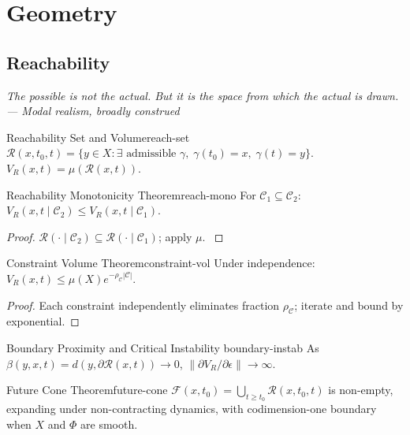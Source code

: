 \documentclass[12pt,twoside,openright]{book}
\newcommand{\reach}{\mathcal{R}}
\newenvironment{epigraph}[2]{%
  \vspace{1em}\begin{flushright}
  \begin{minipage}{0.72\textwidth}
  \itshape\small #1\\[0.4em]
  \upshape\footnotesize\sffamily\color{DistGray}--- #2
  \end{minipage}\end{flushright}\vspace{1.5em}}{}
\begin{document}
\part{Geometry}

\chapter{Reachability}
\label{ch:reachability}
\begin{epigraph}{The possible is not the actual.
  But it is the space from which the actual is drawn.}%
  {Modal realism, broadly construed}
\end{epigraph}

\begin{definition}{Reachability Set and Volume}{reach-set}
  $\reach(x,t_0,t)=\{y\in X:\exists\text{ admissible }
  \gamma,\;\gamma(t_0)=x,\;\gamma(t)=y\}$.
  $V_R(x,t)=\mu(\reach(x,t))$.
\end{definition}

\begin{theorem}{Reachability Monotonicity Theorem}{reach-mono}
  For $\mathcal{C}_1\subseteq\mathcal{C}_2$:
  $V_R(x,t\mid\mathcal{C}_2)\le V_R(x,t\mid\mathcal{C}_1)$.
\end{theorem}
\begin{proof}
  $\reach(\cdot\mid\mathcal{C}_2)\subseteq
  \reach(\cdot\mid\mathcal{C}_1)$; apply $\mu$.
  \parencite{sontag1998}
\end{proof}

\begin{theorem}{Constraint Volume Theorem}{constraint-vol}
  Under independence:
  $V_R(x,t)\le\mu(X)e^{-\rho_\mathcal{C}|\mathcal{C}|}$.
\end{theorem}
\begin{proof}
  Each constraint independently eliminates fraction
  $\rho_\mathcal{C}$; iterate and bound by exponential.
\end{proof}

\begin{theorem}{Boundary Proximity and Critical Instability}%
  {boundary-instab}
  As $\beta(y,x,t)=d(y,\partial\reach(x,t))\to0$,
  $\|\partial V_R/\partial\epsilon\|\to\infty$.
\end{theorem}

\begin{theorem}{Future Cone Theorem}{future-cone}
  $\mathcal{F}(x,t_0)=\bigcup_{t\ge t_0}\reach(x,t_0,t)$
  is non-empty, expanding under non-contracting dynamics,
  with codimension-one boundary when $X$ and $\Phi$ are
  smooth.
\end{theorem}
\end{document}
